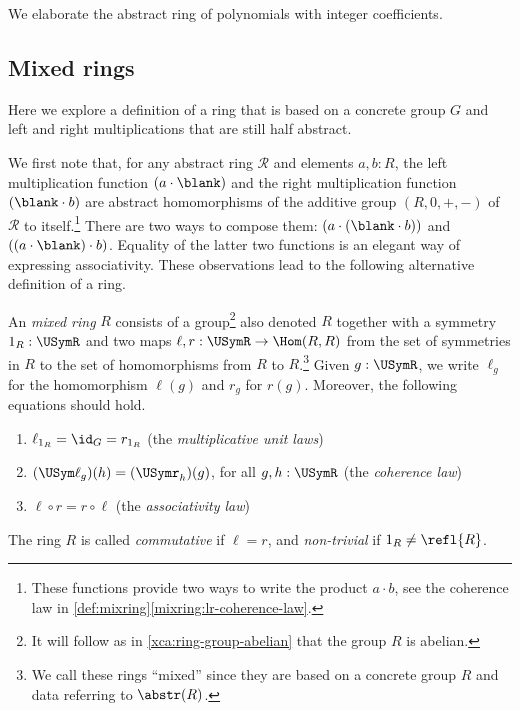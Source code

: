 \begin{example}\label{exa:ring-Z-polynomials}
We elaborate the abstract ring of polynomials with integer coefficients.
\end{example}

\subsection{Mixed rings}\label{sec:mixring}

Here we explore a definition of a ring that is based
on a concrete group $G$ and left and right multiplications 
that are still half abstract. %

We first note that, for any abstract ring $\mathscr R$ and elements $a,b:R$,
the left multiplication function $(a\cdot\blank)$ 
and the right multiplication function $(\blank\cdot b)$ are
abstract homomorphisms
of the additive group $(R,0,+,-)$ of $\mathscr R$ to itself.\footnote{%
    These functions provide two ways to write the product $a\cdot b$,
see the coherence law in \cref{def:mixring}\ref{mixring:lr-coherence-law}.}
There are two ways to compose them: $(a\cdot(\blank\cdot b))$
and $((a\cdot\blank)\cdot b)$. Equality of the latter two functions is
an elegant way of expressing associativity.
These observations lead to the following alternative definition of a ring.

\begin{definition}\label{def:mixring}
An \emph{mixed ring} $R$ consists of a group\footnote{%
It will follow as in \cref{xca:ring-group-abelian} that the group $R$
is abelian.} also denoted $R$ together with
a symmetry $1_R : \USymR$ and two maps $\ell,r: \USymR\to\Hom(R,R)$
from the set of symmetries in $R$ to the set of homomorphisms from
$R$ to $R$.\footnote{We call these rings ``mixed'' since they are
based on a concrete group $R$ and data referring to $\abstr(R)$.}
Given $g:\USymR$, we write $\ell_g$ for the homomorphism $\ell(g)$ and 
$r_g$ for $r(g)$.
Moreover, the following equations should hold.
    \begin{enumerate}
    \item\label{mixring:unit-laws} $\ell_{1_R} = \id_G = r_{1_R}$ (the \emph{multiplicative unit laws})
    \item\label{mixring:lr-coherence-law} $(\USym\ell_g)(h) = (\USymr_h)(g)$, 
    for all $g,h : \USymR$ (the \emph{coherence law})
        \item\label{mixring:assoc-law} $\ell\circ r= r\circ\ell$ (the \emph{associativity law})
    \end{enumerate}
The ring $R$ is called \emph{commutative} if $\ell=r$,
and \emph{non-trivial} if $1_R \neq \refl{R}$.
\end{definition}

